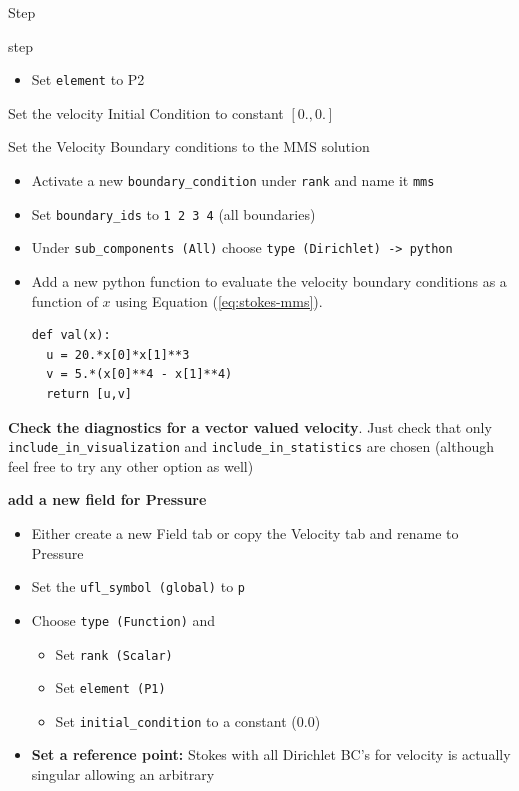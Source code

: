 \begin{steps}{Step}
\begin{steps}{step}
\begin{itemize}{}
    \item Set \texttt{element} to P2
    \end{itemize}
  \item Set the velocity Initial Condition to constant $[0.,0.]$
  \item Set the Velocity Boundary conditions to the MMS solution
    \begin{itemize}
    \item Activate a new \texttt{boundary\_condition} under
      \texttt{rank} and name it \texttt{mms}
    \item Set \texttt{boundary\_ids} to \texttt{1 2 3 4} (all boundaries)
    \item Under \texttt{sub\_components (All)} choose \texttt{type (Dirichlet)
        -> python}
    \item Add a new python function to evaluate the velocity boundary
      conditions as a function of $x$ using Equation (\ref{eq:stokes-mms}).
      \begin{lstlisting}[style=Python]
def val(x):
  u = 20.*x[0]*x[1]**3
  v = 5.*(x[0]**4 - x[1]**4)
  return [u,v]
      \end{lstlisting}
    \end{itemize}
  \item \textbf{Check the diagnostics for a vector valued
      velocity}. Just check that only
    \texttt{include\_in\_visualization} and
    \texttt{include\_in\_statistics} are chosen (although feel free to try any
    other option as well)
    \item \textbf{add a new field for Pressure}
      \begin{itemize}
      \item Either create a new Field tab or copy the Velocity tab and
        rename to Pressure
      \item Set the \texttt{ufl\_symbol (global)} to \texttt{p}
      \item Choose \texttt{type (Function)} and
        \begin{itemize}
        \item Set \texttt{rank (Scalar)}
        \item Set \texttt{element (P1)}
        \item Set \texttt{initial\_condition} to a constant (0.0)
        \end{itemize}
      \item \textbf{Set a reference point:}  Stokes with all Dirichlet 
        BC's for velocity is actually singular allowing an arbitrary

\end{itemize}
\end{steps}
\end{steps}
